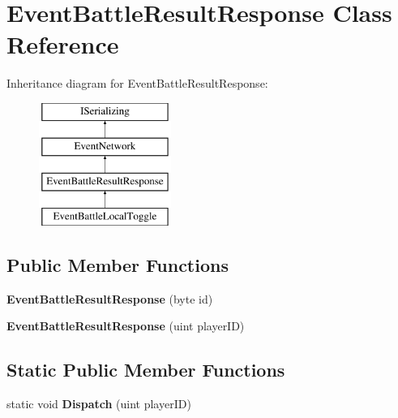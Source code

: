 \hypertarget{class_event_battle_result_response}{\section{Event\-Battle\-Result\-Response Class Reference}
\label{class_event_battle_result_response}
}
Inheritance diagram for Event\-Battle\-Result\-Response\-:\begin{figure}[H]
\begin{center}
\leavevmode
\includegraphics[height=4.000000cm]{class_event_battle_result_response}
\end{center}
\end{figure}
\subsection*{Public Member Functions}
\begin{DoxyCompactItemize}
\item 
\hypertarget{class_event_battle_result_response_add0797e1a302bac9347a13fb24364520}{{\bfseries Event\-Battle\-Result\-Response} (byte id)}\label{class_event_battle_result_response_add0797e1a302bac9347a13fb24364520}

\item 
\hypertarget{class_event_battle_result_response_ac38a0dcea1fabeb95b49ae02ff7e5874}{{\bfseries Event\-Battle\-Result\-Response} (uint player\-I\-D)}\label{class_event_battle_result_response_ac38a0dcea1fabeb95b49ae02ff7e5874}

\end{DoxyCompactItemize}
\subsection*{Static Public Member Functions}
\begin{DoxyCompactItemize}
\item 
\hypertarget{class_event_battle_result_response_a49ed3e8323eb3ff538cd9168b242aefa}{static void {\bfseries Dispatch} (uint player\-I\-D)}\label{class_event_battle_result_response_a49ed3e8323eb3ff538cd9168b242aefa}

\end{DoxyCompactItemize}
